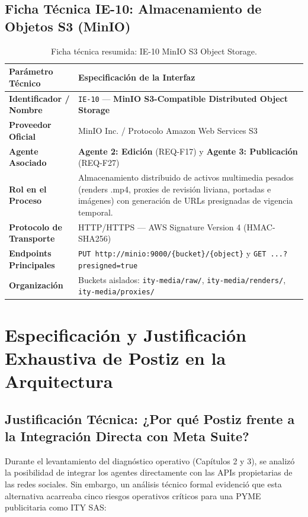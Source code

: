 \documentclass[11pt,a4paper]{article}
\begin{document}
\subsection{Ficha Técnica IE-10: Almacenamiento de Objetos S3 (MinIO)}\label{sec:ie10}
\begin{table}[h!]
\centering
\small
\begin{tabular}{p{4.5cm} p{11cm}}
\toprule
\textbf{Parámetro Técnico} & \textbf{Especificación de la Interfaz} \\
\midrule
\textbf{Identificador / Nombre} & \texttt{IE-10} --- \textbf{MinIO S3-Compatible Distributed Object Storage} \\
\textbf{Proveedor Oficial} & MinIO Inc. / Protocolo Amazon Web Services S3 \\
\textbf{Agente Asociado} & \textbf{Agente 2: Edición} (REQ-F17) y \textbf{Agente 3: Publicación} (REQ-F27) \\
\textbf{Rol en el Proceso} & Almacenamiento distribuido de activos multimedia pesados (renders .mp4, proxies de revisión liviana, portadas e imágenes) con generación de URLs presignadas de vigencia temporal. \\
\textbf{Protocolo de Transporte} & HTTP/HTTPS --- AWS Signature Version 4 (HMAC-SHA256) \\
\textbf{Endpoints Principales} & \texttt{PUT http://minio:9000/\{bucket\}/\{object\}} y \texttt{GET ...?presigned=true} \\
\textbf{Organización} & Buckets aislados: \texttt{ity-media/raw/}, \texttt{ity-media/renders/}, \texttt{ity-media/proxies/} \\
\bottomrule
\end{tabular}
\caption{Ficha técnica resumida: IE-10 MinIO S3 Object Storage.}
\end{table}

\newpage
\section{Especificación y Justificación Exhaustiva de Postiz en la Arquitectura}\label{sec:postiz}

\subsection{Justificación Técnica: ¿Por qué Postiz frente a la Integración Directa con Meta Suite?}\label{sec:postiz-just}

Durante el levantamiento del diagnóstico operativo (Capítulos 2 y 3), se analizó la posibilidad de integrar los agentes directamente con las APIs propietarias de las redes sociales. Sin embargo, un análisis técnico formal evidenció que esta alternativa acarreaba cinco riesgos operativos críticos para una PYME publicitaria como ITY SAS:
\end{document}
